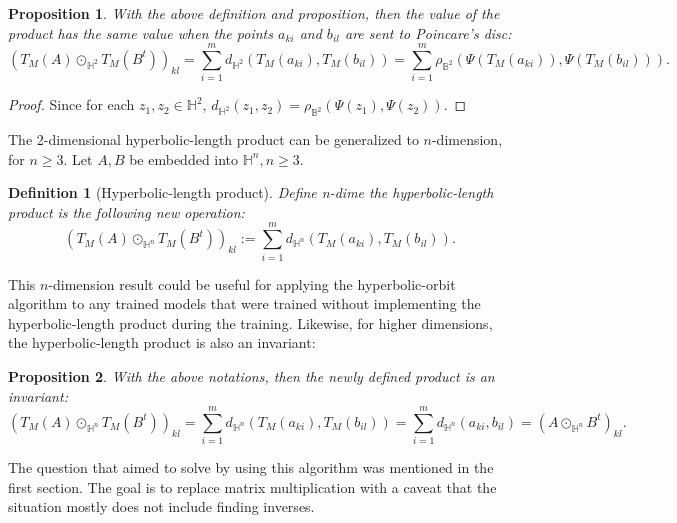 \documentclass{article}
\theoremstyle{plain}
\theoremstyle{plain} %
\newtheorem{proposition}{Proposition}
\newtheorem{definition}[theorem]{Definition}
\theoremstyle{definition}  %
\theoremstyle{remark}  %
\theoremstyle{plain}
\begin{document}
\begin{proposition}
With the above definition and proposition, then the value of the product has the same value when the points $a_{ki}$ and $b_{il}$ are sent to Poincare's disc:
$$
\left( T_M(A) \odot_{\mathbb{H}^2} T_M(B^t)\right)_{kl} = \sum\limits_{i=1}^m d_{\mathbb{H}^2} \left(T_M \left( a_{ki} \right) ,T_M\left( b_{il}\right) \right)
=  \sum\limits_{i=1}^m \rho_{\mathbb{B}^2} \left(\Psi \left(T_M \left( a_{ki} \right)\right) ,\Psi\left( T_M\left( b_{il}\right) \right)\right) .$$
\end{proposition}
\begin{proof}
Since for each $z_1,z_2\in\mathbb{H}^2$, $d_{\mathbb{H}^2}(z_1,z_2)=\rho_{\mathbb{B}^2}(\Psi(z_1),\Psi(z_2)).$
\end{proof}

The 2-dimensional hyperbolic-length product can be generalized to $n$-dimension\cite{MR1138441, MR725161, beardon2012geometry, MR2402415, MR4221225, MR1893917}, for $n\geq 3$. Let $A, B$ be embedded into $\mathbb{H}^n, n\geq 3.$
\begin{definition}[Hyperbolic-length product]
Define \textit{n-dime the hyperbolic-length product} is the following new operation: 
$$
\left( T_M(A) \odot_{\mathbb{H}^n} T_M(B^t)\right)_{kl} := \sum\limits_{i=1}^m d_{\mathbb{H}^n} \left(T_M \left( a_{ki} \right) ,T_M\left( b_{il}\right) \right).
$$
\end{definition} 
This $n$-dimension result could be useful for applying the hyperbolic-orbit algorithm to any trained models that were trained without implementing the hyperbolic-length product during the training.
Likewise, for higher dimensions, the hyperbolic-length product is also an invariant:
\begin{proposition}
With the above notations, then the newly defined product is an invariant:
$$
\left( T_M(A) \odot_{\mathbb{H}^n} T_M(B^t)\right)_{kl} = \sum\limits_{i=1}^m d_{\mathbb{H}^n} \left(T_M \left( a_{ki} \right) ,T_M\left( b_{il}\right) \right)
=  \sum\limits_{i=1}^m d_{\mathbb{H}^n} \left( a_{ki}  , b_{il} \right)  =\left( A\odot_{\mathbb{H}^n} B^t\right)_{kl}.$$
\end{proposition}

The question that aimed to solve by using this algorithm was mentioned in the first section. The goal is to replace matrix multiplication with a caveat that the situation mostly does not include finding inverses.
\end{document}
